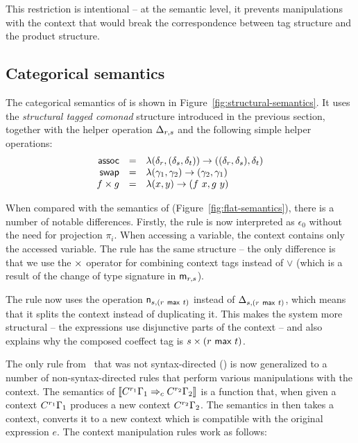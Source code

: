 This restriction is intentional -- at the semantic level, it prevents manipulations
with the context that would break the correspondence between tag structure and the
product structure.

\subsection{Categorical semantics}
The categorical semantics of \clstr is shown in Figure~\ref{fig:structural-semantics}.
It uses the \emph{structural tagged comonad} structure introduced in the previous section,
together with the helper operation $\Delta_{r, s}$ and the following simple helper 
operations:
\begin{equation*}
\begin{array}{rcl}
\textnormal{\sffamily assoc} &=& \lambda (\delta_r, (\delta_s, \delta_t)) \rightarrow ((\delta_r, \delta_s), \delta_t)\\
\textnormal{\sffamily swap}  &=& \lambda (\gamma_1, \gamma_2) \rightarrow (\gamma_2, \gamma_1)\\
f \times g &=& \lambda (x, y) \rightarrow (f~x, g~y)
\end{array}
\end{equation*}

When compared with the semantics of \clflt (Figure~\ref{fig:flat-semantics}), there is a number of 
notable differences. Firstly, the rule  is now interpreted as $\epsilon_0$ without 
the need for projection $\pi_i$. When accessing a variable, the context contains only the accessed
variable. The  rule has the same structure -- the only difference is that we use the
$\times$ operator for combining context tags instead of $\vee$ (which is a result of the change of
type signature in $\textnormal{\sffamily m}_{r, s}$).

The rule  now uses the operation $\textnormal{\sffamily n}_{s, (r ~\textnormal{\sffamily max}~ t)}$ instead of $\Delta_{s, (r ~\textnormal{\sffamily max}~ t)}$,
which means that it splits the context instead of duplicating it. This makes the system more 
structural -- the expressions use disjunctive parts of the context -- and also explains why the
composed coeffect tag is $s \times (r ~\textnormal{\sffamily max}~ t)$.

The only rule from \clflt~that was not syntax-directed () is now generalized to a number
of non-syntax-directed rules  that perform various manipulations with the context. The semantics
of $\llbracket  C^{r_1}\Gamma_1 \Rightarrow_c C^{r_2}\Gamma_2  \rrbracket$ is a function that, when given a context
$C^{r_1}\Gamma_1$ produces a new context $C^{r_2}\Gamma_2$. The semantics in  then 
takes a context, converts it to a new context which is compatible with the original expression $e$.
The context manipulation rules work as follows:

